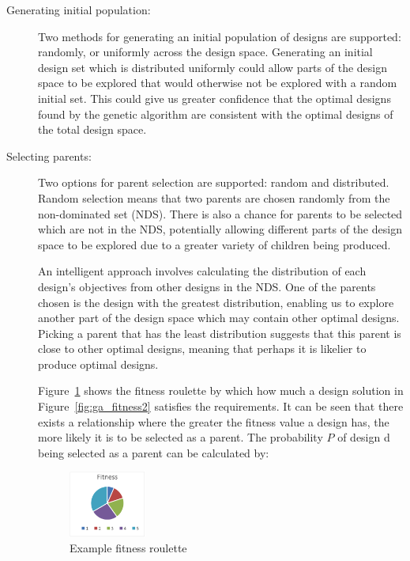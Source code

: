 \begin{description}
\item[Generating initial population:] Two methods for generating an initial population of designs are supported: randomly, or uniformly across the design space. Generating an initial design set which is distributed uniformly could allow parts of the design space to be explored that would otherwise not be explored with a random initial set. This could give us greater confidence that the optimal designs found by the genetic algorithm are consistent with the optimal designs of the total design space.
\item[Selecting parents:] Two options for parent selection are supported: random and distributed. Random selection means that two parents are chosen randomly from the non-dominated set (NDS). There is also a chance for parents to be selected which are not in the NDS, potentially allowing different parts of the design space to be explored due to a greater variety of children being produced.


An intelligent approach involves calculating the distribution of each design's objectives from other designs in the NDS. One of the parents chosen is the design with the greatest distribution, enabling us to explore another part of the design space which may contain other optimal designs. Picking a parent that has the least distribution suggests that this parent is close to other optimal designs, meaning that perhaps it is likelier to produce optimal designs.
		
Figure~\ref{fig:ga_fitness} shows the fitness roulette by which how much a design solution in Figure~\ref{fig:ga_fitness2} satisfies the requirements. It can be seen that there exists a relationship where the greater the fitness value a design has, the more likely it is to be selected as a parent. The probability $P$ of design d being selected as a parent can be calculated by:

\begin{figure}[htbp]
\centering
\includegraphics[width=0.25\textwidth]{figures/ga_fitness}
\caption{Example fitness roulette}
\label{fig:ga_fitness}
\end{figure}


\end{description}
